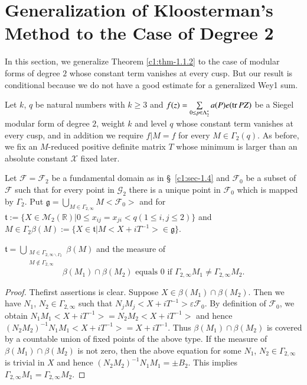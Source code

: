 \section[Generalization of Kloosterman's Method...]{Generalization of Kloosterman's Method to the Case of
  Degree 2}\label{c1:sec-1.5}\pageoriginale

In this section, we generalize Theorem \ref{c1:thm-1.1.2} to the case of
modular forms of degree $2$ whose constant term vanishes at every
cusp. But our result is conditional because we do not have a good
estimate for a generalized Wey1 sum.

Let $k$, $q$ be natural numbers with $k\geq 3$ and
$f(z)=\sum\limits_{0\leq p\in\Lambda^{\ast}_{2}}a(P)\break e(\tr PZ)$ be a
Siegel modular form of degree $2$, weight $k$ and level $q$ whose
constant term vanishes at every cusp, and in addition we require
$f|M=f$ for every $M\in\Gamma_{2}(q)$. As before, we fix an
$M$-reduced positive definite matrix $T$ whose minimum is larger than
an absolute constant $\mathscr{X}$ fixed later.

Let $\mathscr{F}=\mathscr{F}_{2}$ be a fundamental domain as in
\S\ \ref{c1:sec-1.4} and $\mathscr{F}_{0}$ be a subset of
$\mathscr{F}$ such that for every point in $\mathscr{G}_{2}$ there is
a unique point in $\mathscr{F}_{0}$ which is mapped by
$\Gamma_{2}$. Put
$\mathfrak{g}=\bigcup\limits_{M\in\Gamma_{2,\infty}}M<\mathscr{F}_{0}>$
and for $\mathfrak{t}:=\{X\in\mathscr{M}_{2}(\mathbb{R})|0\leq
x_{ij}=x_{ji}<q(1\leq i,j\leq 2)\}$ and $M\in
\Gamma_{2}\beta(M):=\{X\in\mathfrak{t}|M<X+iT^{-1}>\in\mathfrak{g}\}$.

\begin{sublemma}\label{c1:lem-1.5.1}
$\mathfrak{t}=\bigcup\limits_{\substack{M\in\Gamma_{2,\infty\backslash
        \Gamma_{2}}\\ M\not\in \Gamma_{2,\infty}}}\beta(M)$ and the
  measure of 
$$
\beta(M_{1})\cap \beta(M_{2})\text{ \ equals \ } 0 \text{ \  if \ }
\Gamma_{2,\infty}M_{1}\neq \Gamma_{2,\infty}M_{2}.
$$
\end{sublemma}

\begin{proof}
The\pageoriginale first assertions is clear. Suppose
$X\in\beta(M_{1})\cap \beta(M_{2})$. Then we have $N_{1}$,
$N_{2}\in\Gamma_{2,\infty}$ such that
$N_{j}M_{j}<X+iT^{-1}>\varepsilon\mathscr{F}_{0}$. By definition of
$\mathscr{F}_{0}$, we obtain
$N_{1}M_{1}<X+iT^{-1}>=N_{2}M_{2}<X+iT^{-1}>$ and hence
$(N_{2}M_{2})^{-1}N_{1}M_{1}<X+iT^{-1}>=X+iT^{-1}$. Thus
$\beta(M_{1})\cap \beta(M_{2})$ is covered by a countable union of
fixed points of the above type. If the measure of $\beta(M_{1})\cap
\beta(M_{2})$ is not zero, then the above equation for some $N_{1}$,
$N_{2}\in\Gamma_{2,\infty}$ is trivial in $X$ and hence
$(N_{2}M_{2})^{-1}N_{1}M_{1}=\pm B_{2}$. This implies
$\Gamma_{2,\infty}M_{1}=\Gamma_{2,\infty}M_{2}$. 
\end{proof}

